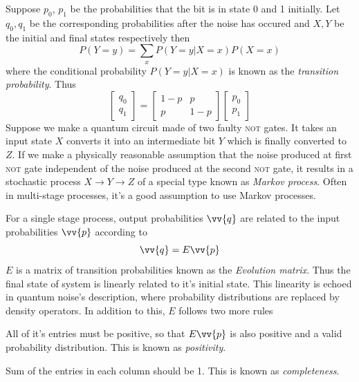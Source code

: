 Suppose $p_0$, $p_1$ be the probabilities that the bit is in state 0 and 1 initially. Let $q_0, q_1$ be the corresponding probabilities after the noise has occured and $X, Y$ be the initial and final states respectively then
\begin{equation}
    P(Y=y) = \sum_x P(Y=y | X=x)P(X=x)
\end{equation}
where the conditional probability $P(Y=y | X=x)$ is known as the \textit{transition probability}. Thus
\begin{equation}
    \begin{bmatrix}
        q_0 \\ q_1
    \end{bmatrix}
    = \begin{bmatrix}
        1-p & p \\ p & 1-p
    \end{bmatrix}
    \begin{bmatrix}
        p_0 \\ p_1
    \end{bmatrix}
\end{equation}
Suppose we make a quantum circuit made of two faulty \textsc{not} gates. It takes an input state $X$ converts it into an intermediate bit $Y$ which is finally converted to $Z$. If we make a physically reasonable assumption that the noise produced at first \textsc{not} gate independent of the noise produced at the second \textsc{not} gate, it results in a stochastic process $X\longrightarrow Y\longrightarrow Z$ of a special type known as \textit{Markov process}. Often in multi-stage processes, it's a good assumption to use Markov processes. 

For a single stage process, output probabilities $\vv{q}$ are related to the input probabilities $\vv{p}$ according to
\begin{equation}
    \vv{q} = E\vv{p}
\end{equation}
$E$ is a matrix of transition probabilities known as the \textit{Evolution matrix}. Thus the final state of system is linearly related to it's initial state. This linearity is echoed in quantum noise's description, where probability distributions are replaced by density operators. In addition to this, $E$ follows two more rules
\begin{enumerate*}[label=(\alph*)]
    \item All of it's entries must be positive, so that $E\vv{p}$ is also positive and a valid probability distribution. This is known as \textit{positivity}.
    \item Sum of the entries in each column should be 1. This is known as \textit{completeness}.
\end{enumerate*}

